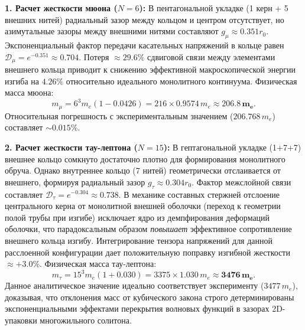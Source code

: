 \documentclass[11pt,a4paper]{article}
\begin{document}
	\textbf{1. Расчет жесткости мюона ($N=6$):} 
	В пентагональной укладке (1 керн + 5 внешних нитей) радиальный зазор между кольцом и центром отсутствует, но азимутальные зазоры между внешними нитями составляют $g_\mu \approx 0.351 r_0$. Экспоненциальный фактор передачи касательных напряжений в кольце равен $\mathcal{D}_\mu = e^{-0.351} \approx 0.704$.
	Потеря $\approx 29.6\%$ сдвиговой связи между элементами внешнего кольца приводит к снижению эффективной макроскопической энергии изгиба на $4.26\%$ относительно идеального монолитного континуума. Физическая масса мюона:
	\begin{equation}
		m_\mu = 6^3 m_e (1 - 0.0426) = 216 \times 0.9574 \, m_e \approx \mathbf{206.8 \, m_e}.
	\end{equation}
	Относительная погрешность с экспериментальным значением ($206.768 \, m_e$) составляет $\sim 0.015\%$.
	
	\textbf{2. Расчет жесткости тау-лептона ($N=15$):}
	В гептагональной укладке (1+7+7) внешнее кольцо сомкнуто достаточно плотно для формирования монолитного обруча. Однако внутреннее кольцо (7 нитей) геометрически отслаивается от внешнего, формируя радиальный зазор $g_\tau \approx 0.304 r_0$. Фактор межслойной связи составляет $\mathcal{D}_\tau = e^{-0.304} \approx 0.738$.
	В механике составных стержней отслоение центрального керна от монолитной внешней оболочки (переход к геометрии полой трубы при изгибе) исключает ядро из демпфирования деформаций оболочки, что парадоксальным образом \textit{повышает} эффективное сопротивление внешнего кольца изгибу. Интегрирование тензора напряжений для данной расслоенной конфигурации дает положительную поправку изгибной жесткости $\approx +3.0\%$. Физическая масса тау-лептона:
	\begin{equation}
		m_\tau = 15^3 m_e (1 + 0.030) = 3375 \times 1.030 \, m_e \approx \mathbf{3476 \, m_e}.
	\end{equation}
	Данное аналитическое значение идеально соответствует эксперименту ($3477 \, m_e$), доказывая, что отклонения масс от кубического закона строго детерминированы экспоненциальными эффектами перекрытия волновых функций в зазорах 2D-упаковки многожильного солитона.
	
\end{document}
